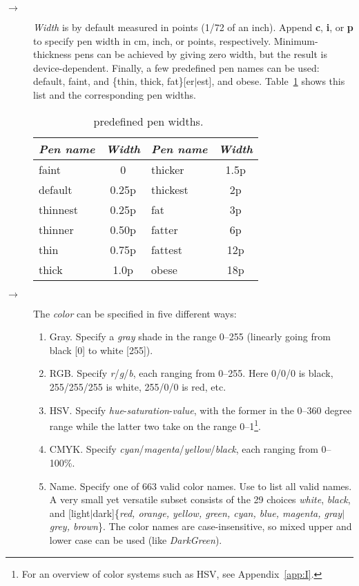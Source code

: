 \begin{description}
%
\item[$\rightarrow$]\emph{Width} is by default measured in points (1/72 of an inch).
Append \textbf{c}, \textbf{i}, or \textbf{p} to specify pen width in cm, inch, or points,
respectively.
Minimum-thickness pens can be achieved by
giving zero width, but the result is device-dependent.  Finally, a few
predefined pen names can be used: default, faint, and \{thin, thick, fat\}[er$|$est],
and obese.  Table~\ref{tbl:pennames} shows this list and the corresponding pen widths.
\begin{table}[h]
\centering
\begin{tabular}{|l|c||l|c|} \hline
\multicolumn{1}{|c|}{\emph{Pen name}}	&	\multicolumn{1}{c|}{\emph{Width}}	&	\multicolumn{1}{|c|}{\emph{Pen name}}	&	\multicolumn{1}{c|}{\emph{Width}} \\ \hline
faint		&	0	&	thicker		&	1.5p \\ \hline
default		&	0.25p	&	thickest	&	2p \\ \hline
thinnest	&	0.25p	&	fat		&	3p \\ \hline
thinner		&	0.50p	&	fatter		&	6p \\ \hline
thin		&	0.75p	&	fattest		&	12p \\ \hline
thick		&	1.0p	&	obese		&	18p \\	\hline
\end{tabular}
\caption{\gmt\ predefined pen widths.}
\label{tbl:pennames}
\end{table}

%
\item[$\rightarrow$]The \emph{color} can be specified in five different ways:
\begin{enumerate}
\item Gray. Specify a \emph{gray} shade in the range 0--255 (linearly going from black [0] to white [255]).
\item RGB. Specify \emph{r}/\emph{g}/\emph{b}, each ranging from 0--255.  Here 0/0/0 is black, 255/255/255 is white,
255/0/0 is red, etc.
\item HSV. Specify \emph{hue}-\emph{saturation}-\emph{value}, with the former in the 0--360 degree range while the latter
two take on the range 0--1\footnote{For an overview of color systems such as HSV, see Appendix~\ref{app:I}.}.
\item CMYK. Specify \emph{cyan}/\emph{magenta}/\emph{yellow}/\emph{black}, each ranging from 0--100\%.
\item Name.  Specify one of 663 valid color names.  Use  to list all valid names.
A very small yet versatile subset consists of the 29 choices \emph{white}, \emph{black}, and
[light$|$dark]\{\emph{red,
orange, yellow, green, cyan, blue, magenta, gray$|$grey, brown}\}.
The color names are case-insensitive, so mixed upper and lower case can be used (like
\emph{DarkGreen}).
\end{enumerate}


\end{description}
